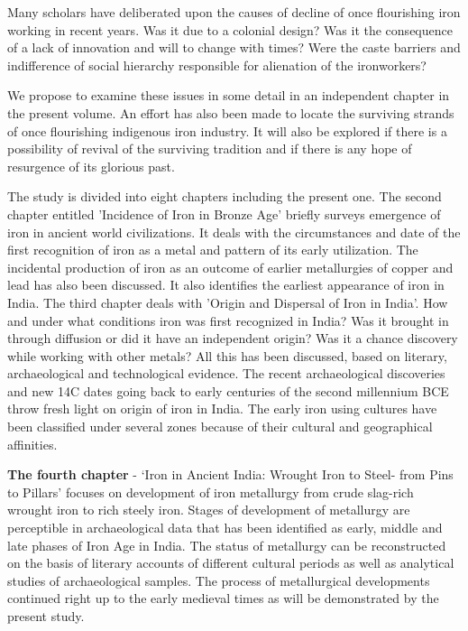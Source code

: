 Many scholars have deliberated upon the causes of decline of once flourishing iron working in recent years. Was it due to a colonial design? Was it the consequence of a lack of innovation and will to change with times? Were the caste barriers and indifference of social hierarchy responsible for alienation of the ironworkers?

We propose to examine these issues in some detail in an independent chapter in the present volume. An effort has also been made to locate the surviving strands of once flourishing indigenous iron industry. It will also be explored if there is a possibility of revival of the surviving tradition and if there is any hope of resurgence of its glorious past.

The study is divided into eight chapters including the present one. The second chapter entitled 'Incidence of Iron in Bronze Age' briefly surveys emergence of iron in ancient world civilizations. It deals with the circumstances and date of the first recognition of iron as a metal and pattern of its early utilization. The incidental production of iron as an outcome of earlier metallurgies of copper and lead has also been discussed. It also identifies the earliest appearance of iron in India. The third chapter deals with 'Origin and Dispersal of Iron in India'. How and under what conditions iron was first recognized in India? Was it brought in through diffusion or did it have an independent origin? Was it a chance discovery while working with other metals? All this has been discussed, based on literary, archaeological and technological evidence. The recent archaeological discoveries and new 14C dates going back to early centuries of the second millennium BCE throw fresh light on origin of iron in India. The early iron using cultures have been classified under several zones because of their cultural and geographical affinities.

\begin{myquote}
\textbf{The fourth chapter} - `Iron in Ancient India: Wrought Iron to Steel- from Pins to Pillars' focuses on development of iron metallurgy from crude slag-rich wrought iron to rich steely iron. Stages of development of metallurgy are perceptible in archaeological data that has been identified as early, middle and late phases of Iron Age in India. The status of metallurgy can be reconstructed on the basis of literary accounts of different cultural periods as well as analytical studies of archaeological samples. The process of metallurgical developments continued right up to the early medieval times as will be demonstrated by the present study.
\end{myquote}

